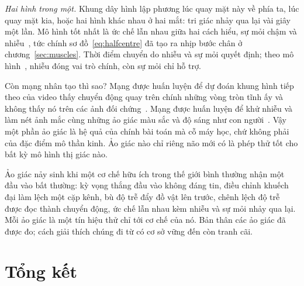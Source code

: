 \emph{Hai hình trong một.} Khung dây hình lập phương lúc quay mặt này về phía ta, lúc quay mặt kia, hoặc hai hình khác nhau ở hai mắt: tri giác nhảy qua lại vài giây một lần. Mô hình tốt nhất là ức chế lẫn nhau giữa hai cách hiểu, sự mỏi chậm và nhiễu~\cite{MorenoBote2007}, tức chính sơ đồ~\eqref{eq:halfcentre} đã tạo ra nhịp bước chân ở chương~\ref{sec:muscles}. Thời điểm chuyển do nhiễu và sự mỏi quyết định; theo mô hình~\cite{MorenoBote2007}, nhiễu đóng vai trò chính, còn sự mỏi chỉ hỗ trợ.

Còn mạng nhân tạo thì sao? Mạng được huấn luyện để dự đoán khung hình tiếp theo của video thấy chuyển động quay trên chính những vòng tròn tĩnh ấy và không thấy nó trên các ảnh đối chứng~\cite{Watanabe2018}. Mạng được huấn luyện để khử nhiễu và làm nét ảnh mắc cùng những ảo giác màu sắc và độ sáng như con người~\cite{GomezVilla2020}. Vậy một phần ảo giác là hệ quả của chính bài toán mà cỗ máy học, chứ không phải của đặc điểm mô thần kinh. Ảo giác nào chỉ riêng não mới có là phép thử tốt cho bất kỳ mô hình thị giác nào.

\begin{keyblock}
\begin{proposition}
\label{prop:illusions}
Ảo giác nảy sinh khi một cơ chế hữu ích trong thế giới bình thường nhận một đầu vào bất thường: kỳ vọng thắng đầu vào không đáng tin, điều chỉnh khuếch đại làm lệch một cặp kênh, bù độ trễ đẩy đồ vật lên trước, chênh lệch độ trễ được đọc thành chuyển động, ức chế lẫn nhau kèm nhiễu và sự mỏi nhảy qua lại. Mỗi ảo giác là một tín hiệu thử chỉ tới cơ chế của nó. Bản thân các ảo giác đã được đo; cách giải thích chúng đi từ có cơ sở vững đến còn tranh cãi.
\end{proposition}
\end{keyblock}

\section{Tổng kết}

